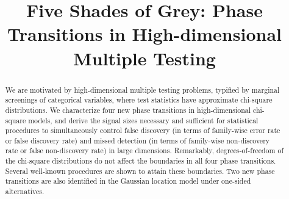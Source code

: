 \documentclass[ejs, preprint]{imsart}
\numberwithin{equation}{section}
\theoremstyle{plain}
\theoremstyle{definition}
\theoremstyle{remark}
\begin{document}
\begin{frontmatter}
\title{\Large{Five Shades of Grey: Phase Transitions in High-dimensional Multiple Testing}} %

\begin{aug}
\author{ }

\address{Department of Statistics, University of Michigan, Ann Arbor, USA\\
}



\end{aug}

\begin{abstract}
We are motivated by high-dimensional multiple testing problems, typified by marginal screenings of categorical variables, where test statistics have approximate chi-square distributions.
We characterize four new phase transitions in high-dimensional chi-square models, and derive the signal sizes necessary and sufficient for statistical procedures to simultaneously control false discovery (in terms of family-wise error rate or false discovery rate) and missed detection (in terms of family-wise non-discovery rate or false non-discovery rate) in large dimensions.
Remarkably, degrees-of-freedom of the chi-square distributions do not affect the boundaries in all four phase transitions.
Several well-known procedures are shown to attain these boundaries.
Two new phase transitions are also identified in the Gaussian location model under one-sided alternatives.


\end{abstract}
\end{frontmatter}
\end{document}
